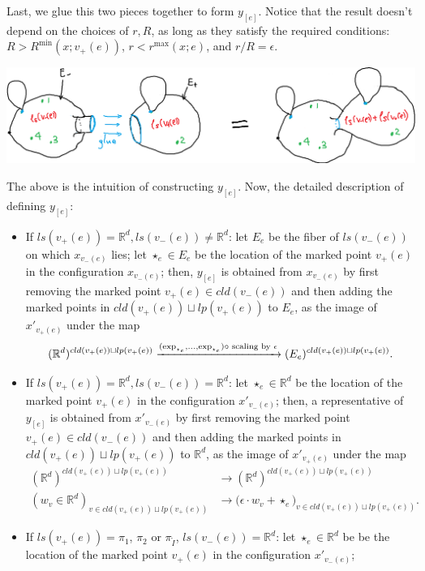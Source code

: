 \documentclass[11pt]{article}
\theoremstyle{definition}
\theoremstyle{remark}
\def\R{\mathbb{R}}
\def\rI{{\mathring{I}}}
\def\tn#1{\textnormal{#1}}
\begin{document}
Last, we glue this two pieces together to form $y_{[e]}$. Notice that the result doesn't depend on the choices of $r,R$, as long as they satisfy the required conditions:
$R>R^{\min}(x;v_+(e))$, $r<r^{\max}(x;e)$, and $r/R=\epsilon$. 

\includegraphics[scale=0.5]{yedfn3_fig}


The above is the intuition of constructing $y_{[e]}$. Now, the detailed description of defining $y_{[e]}$: 

\begin{itemize}
\item If $ls(v_+(e))=\R^d, ls(v_-(e))\neq\R^d$:
let $E_e$ be the fiber of $ls(v_-(e))$ on which $x_{v_-(e)}$ lies;
let $\star_e\in E_e$ be the location of the marked point $v_+(e)$ in the configuration $x_{v_-(e)}$; 
then, 
$y_{[e]}$ is obtained from $x_{v_-(e)}$ by first removing the marked point $v_+(e)\in cld(v_-(e))$ and then adding the marked points in $cld(v_+(e))\sqcup lp(v_+(e))$ to $E_e$, as the image of $x'_{v_+(e)}$ under the map
$$(\R^d)^{cld(v_+(e))\sqcup lp(v_+(e))}\xrightarrow{(\exp_{\star_e},\ldots,\exp_{\star_e})\circ\tn{ scaling by }\epsilon}(E_e)^{cld(v_+(e))\sqcup lp(v_+(e))}.$$
\item If $ls(v_+(e))=\R^d, ls(v_-(e))=\R^d$: let $\star_e\in \R^d$ be the location of the marked point $v_+(e)$ in the configuration $x'_{v_-(e)}$; then, 
a representative of $y_{[e]}$ is obtained from $x'_{v_-(e)}$ by first removing the marked point $v_+(e)\in cld(v_-(e))$ and then adding the marked points in $cld(v_+(e))\sqcup lp(v_+(e))$ to $\R^d$, as the image of $x'_{v_+(e)}$ under the map
\begin{align*}
(\R^d)^{cld(v_+(e))\sqcup lp(v_+(e))}&\longrightarrow(\R^d)^{cld(v_+(e))\sqcup lp(v_+(e))}\\
(w_v\in\R^d)_{v\in cld(v_+(e))\sqcup lp(v_+(e))}&\longrightarrow\big(\epsilon\cdot w_v+\star_e\big)_{v\in cld(v_+(e))\sqcup lp(v_+(e))}.
\end{align*}
\item If $ls(v_+(e))=\pi_1$, $\pi_2$ or $\pi_\rI$, $ls(v_-(e))=\R^d$:  
let $\star_e\in\R^d$ be be the location of the marked point $v_+(e)$ in the configuration $x'_{v_-(e)}$; 

\end{itemize}
\end{document}
